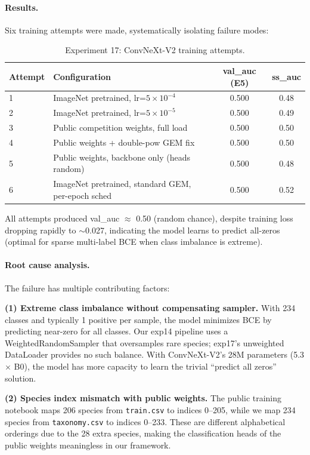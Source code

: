 \paragraph{Results.}
Six training attempts were made, systematically isolating failure modes:

\begin{table}[h]
\centering
\caption{Experiment 17: ConvNeXt-V2 training attempts.}
\label{tab:exp17}
\small
\begin{tabular}{llcc}
\hline
\textbf{Attempt} & \textbf{Configuration} & \textbf{val\_auc (E5)} & \textbf{ss\_auc} \\
\hline
1 & ImageNet pretrained, lr=$5 \times 10^{-4}$ & 0.500 & 0.48 \\
2 & ImageNet pretrained, lr=$5 \times 10^{-5}$ & 0.500 & 0.49 \\
3 & Public competition weights, full load & 0.500 & 0.50 \\
4 & Public weights + double-pow GEM fix & 0.500 & 0.50 \\
5 & Public weights, backbone only (heads random) & 0.500 & 0.48 \\
6 & ImageNet pretrained, standard GEM, per-epoch sched & 0.500 & 0.52 \\
\hline
\end{tabular}
\end{table}

All attempts produced val\_auc $\approx$ 0.50 (random chance), despite training
loss dropping rapidly to $\sim$0.027, indicating the model learns to predict
all-zeros (optimal for sparse multi-label BCE when class imbalance is extreme).

\paragraph{Root cause analysis.}
The failure has multiple contributing factors:

\textbf{(1) Extreme class imbalance without compensating sampler.}
With 234 classes and typically 1 positive per sample, the model minimizes BCE
by predicting near-zero for all classes. Our exp14 pipeline uses a
WeightedRandomSampler that oversamples rare species; exp17's unweighted
DataLoader provides no such balance. With ConvNeXt-V2's 28M parameters (5.3$\times$
B0), the model has more capacity to learn the trivial ``predict all zeros'' solution.

\textbf{(2) Species index mismatch with public weights.}
The public training notebook maps 206 species from \texttt{train.csv} to indices
0--205, while we map 234 species from \texttt{taxonomy.csv} to indices 0--233.
These are different alphabetical orderings due to the 28 extra species, making
the classification heads of the public weights meaningless in our framework.

